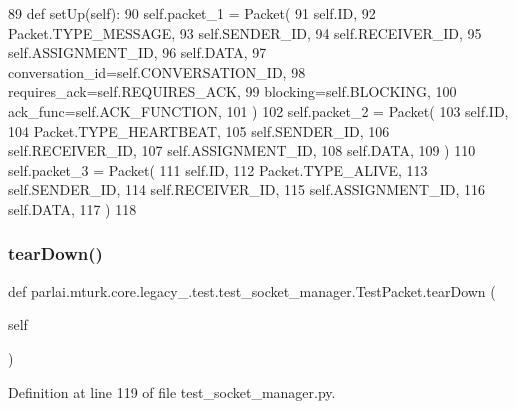 \begin{DoxyCode}
89     \textcolor{keyword}{def }setUp(self):
90         self.packet\_1 = Packet(
91             self.ID,
92             Packet.TYPE\_MESSAGE,
93             self.SENDER\_ID,
94             self.RECEIVER\_ID,
95             self.ASSIGNMENT\_ID,
96             self.DATA,
97             conversation\_id=self.CONVERSATION\_ID,
98             requires\_ack=self.REQUIRES\_ACK,
99             blocking=self.BLOCKING,
100             ack\_func=self.ACK\_FUNCTION,
101         )
102         self.packet\_2 = Packet(
103             self.ID,
104             Packet.TYPE\_HEARTBEAT,
105             self.SENDER\_ID,
106             self.RECEIVER\_ID,
107             self.ASSIGNMENT\_ID,
108             self.DATA,
109         )
110         self.packet\_3 = Packet(
111             self.ID,
112             Packet.TYPE\_ALIVE,
113             self.SENDER\_ID,
114             self.RECEIVER\_ID,
115             self.ASSIGNMENT\_ID,
116             self.DATA,
117         )
118 
\end{DoxyCode}
\mbox{\label{classparlai_1_1mturk_1_1core_1_1legacy__2018_1_1test_1_1test__socket__manager_1_1TestPacket_a65cbd71cd4f8468d4cd6ce30a5f16948}} 
\subsubsection{\texorpdfstring{tear\+Down()}{tearDown()}}
{\footnotesize\ttfamily def parlai.\+mturk.\+core.\+legacy\+\_.\+test.\+test\+\_\+socket\+\_\+manager.\+Test\+Packet.\+tear\+Down (\begin{DoxyParamCaption}\item[{}]{self }\end{DoxyParamCaption})}



Definition at line 119 of file test\+\_\+socket\+\_\+manager.\+py.


